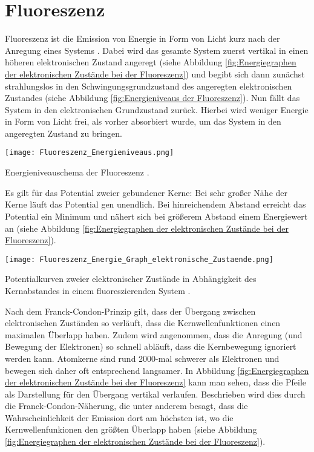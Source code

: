 \section{Fluoreszenz}

Fluoreszenz ist die Emission von Energie in Form von Licht kurz nach der Anregung eines Systems \cite{Atkins2001}. Dabei wird das gesamte System zuerst vertikal in einen höheren elektronischen Zustand angeregt (siehe Abbildung \ref{fig:Energiegraphen der elektronischen Zustände bei der Fluoreszenz}) und begibt sich dann zunächst strahlungslos in den Schwingungsgrundzustand des angeregten elektronischen Zustandes (siehe Abbildung \ref{fig:Energieniveaus der Fluoreszenz}). Nun fällt das System in den elektronischen Grundzustand zurück. Hierbei wird weniger Energie in Form von Licht frei, als vorher absorbiert wurde, um das System in den angeregten Zustand zu bringen.

\begin{dsafigure}
	\centering
	\texttt{[image: Fluoreszenz\_Energieniveaus.png]}
	\label{fig:Energieniveaus der Fluoreszenz}
	\caption{Energieniveauschema der Fluoreszenz \cite{wikiJablonskiDiagramm}.}
\end{dsafigure}

Es gilt für das Potential zweier gebundener Kerne: Bei sehr großer Nähe der Kerne läuft das Potential gen unendlich. Bei hinreichendem Abstand erreicht das Potential ein Minimum und nähert sich bei größerem Abstand einem Energiewert an (siehe Abbildung \ref{fig:Energiegraphen der elektronischen Zustände bei der Fluoreszenz}).

\begin{dsafigure}
	\centering
	\texttt{[image: Fluoreszenz\_Energie\_Graph\_elektronische\_Zustaende.png]}
	\label{fig:Energiegraphen der elektronischen Zustände bei der Fluoreszenz}
	\caption{Potentialkurven zweier elektronischer Zustände in Abhängigkeit des Kernabstandes in einem fluoreszierenden System \cite{wikiFranckCondonPrinzip}.}
\end{dsafigure}

Nach dem Franck-Condon-Prinzip gilt, dass der Übergang zwischen elektronischen Zuständen so verläuft, dass die Kernwellenfunktionen einen maximalen Überlapp haben. Zudem wird angenommen, dass die Anregung (und Bewegung der Elektronen) so schnell abläuft, dass die Kernbewegung ignoriert werden kann. Atomkerne sind rund 2000-mal schwerer als Elektronen und bewegen sich daher oft entsprechend langsamer. In Abbildung \ref{fig:Energiegraphen der elektronischen Zustände bei der Fluoreszenz} kann man sehen, dass die Pfeile als Darstellung für den Übergang vertikal verlaufen. Beschrieben wird dies durch die Franck-Condon-Näherung, die unter anderem besagt, dass die Wahrscheinlichkeit der Emission dort am höchsten ist, wo die Kernwellenfunkionen den größten Überlapp haben (siehe Abbildung \ref{fig:Energiegraphen der elektronischen Zustände bei der Fluoreszenz}).
